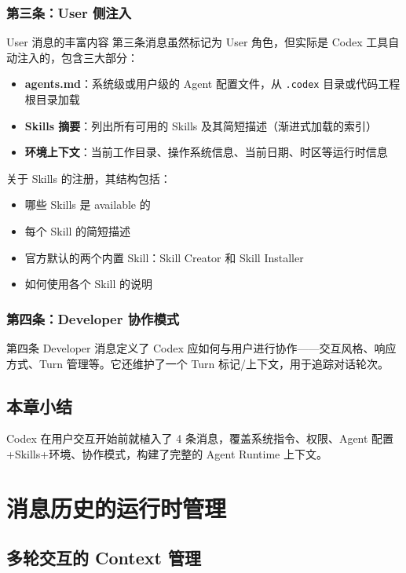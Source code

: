 \documentclass[a4paper]{article}
\begin{document}
\subsubsection{第三条：User 侧注入}

\begin{knowledgebox}{User 消息的丰富内容}
第三条消息虽然标记为 User 角色，但实际是 Codex 工具自动注入的，包含三大部分：
\begin{itemize}
    \item \textbf{agents.md}：系统级或用户级的 Agent 配置文件，从 \texttt{.codex} 目录或代码工程根目录加载
    \item \textbf{Skills 摘要}：列出所有可用的 Skills 及其简短描述（渐进式加载的索引）
    \item \textbf{环境上下文}：当前工作目录、操作系统信息、当前日期、时区等运行时信息
\end{itemize}
\end{knowledgebox}

关于 Skills 的注册，其结构包括：
\begin{itemize}
    \item 哪些 Skills 是 available 的
    \item 每个 Skill 的简短描述
    \item 官方默认的两个内置 Skill：Skill Creator 和 Skill Installer
    \item 如何使用各个 Skill 的说明
\end{itemize}

\subsubsection{第四条：Developer 协作模式}

第四条 Developer 消息定义了 Codex 应如何与用户进行协作——交互风格、响应方式、Turn 管理等。它还维护了一个 Turn 标记/上下文，用于追踪对话轮次。

\subsection{本章小结}

Codex 在用户交互开始前就植入了 4 条消息，覆盖系统指令、权限、Agent 配置+Skills+环境、协作模式，构建了完整的 Agent Runtime 上下文。


\section{消息历史的运行时管理}

\subsection{多轮交互的 Context 管理}
\end{document}
